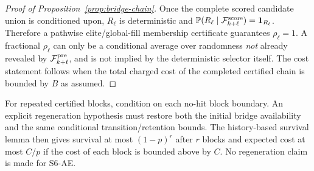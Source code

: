 \begin{proof}[Proof of Proposition~\ref{prop:bridge-chain}]
Once the complete scored candidate union is conditioned upon, $R_\ell$
is deterministic and $\mathbb{P}(R_\ell\mid\mathcal F_{k+\ell}^{\rm score})
=\mathbf 1_{R_\ell}$. Therefore a pathwise elite/global-fill membership
certificate guarantees $\rho_\ell=1$. A fractional $\rho_\ell$ can only
be a conditional average over randomness \emph{not} already revealed by
$\mathcal F_{k+\ell}^{\rm pre}$, and is not implied by the deterministic
selector itself. The cost statement follows when the total charged cost
of the completed certified chain is bounded by $B$ as assumed.
\end{proof}

For repeated certified blocks, condition on each no-hit block boundary.
An explicit regeneration hypothesis must restore both the initial bridge
availability and the same conditional transition/retention bounds.
The history-based survival lemma then gives survival at most $(1-p)^r$
after $r$ blocks and expected cost at most $C/p$ if the cost of each
block is bounded above by $C$. No regeneration claim is made for S6-AE.

